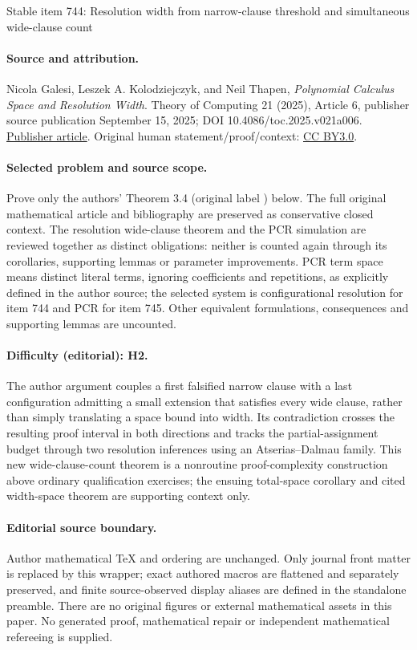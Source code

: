 \documentclass[11pt]{article}
\numberwithin{equation}{section}
\theoremstyle{definition}
\theoremstyle{plain}
\begin{document}
\begin{center}{\Large Stable item 744: Resolution width from narrow-clause threshold and simultaneous wide-clause count}\end{center}
\paragraph{Source and attribution.}
Nicola Galesi, Leszek A. Kolodziejczyk, and Neil Thapen, \emph{Polynomial Calculus Space and Resolution Width}. Theory of Computing 21 (2025), Article 6, publisher source publication September 15, 2025; DOI 10.4086/toc.2025.v021a006. \href{https://theoryofcomputing.org/articles/v021a006/}{Publisher article}. Original human statement/proof/context: \href{https://creativecommons.org/licenses/by/3.0/}{CC BY3.0}.
\paragraph{Selected problem and source scope.}
Prove only the authors' Theorem 3.4 (original label ) below. The full original mathematical article and bibliography are preserved as conservative closed context. The resolution wide-clause theorem and the PCR simulation are reviewed together as distinct obligations: neither is counted again through its corollaries, supporting lemmas or parameter improvements. PCR term space means distinct literal terms, ignoring coefficients and repetitions, as explicitly defined in the author source; the selected system is configurational resolution for item 744 and PCR for item 745.  Other equivalent formulations, consequences and supporting lemmas are uncounted.
\paragraph{Difficulty (editorial): H2.}
The author argument couples a first falsified narrow clause with a last configuration admitting a small extension that satisfies every wide clause, rather than simply translating a space bound into width. Its contradiction crosses the resulting proof interval in both directions and tracks the partial-assignment budget through two resolution inferences using an Atserias--Dalmau family. This new wide-clause-count theorem is a nonroutine proof-complexity construction above ordinary qualification exercises; the ensuing total-space corollary and cited width-space theorem are supporting context only.
\paragraph{Editorial source boundary.}
Author mathematical TeX and ordering are unchanged. Only journal front matter is replaced by this wrapper; exact authored macros are flattened and separately preserved, and finite source-observed display aliases are defined in the standalone preamble. There are no original figures or external mathematical assets in this paper.  No generated proof, mathematical repair or independent mathematical refereeing is supplied. 
\clearpage
\end{document}
